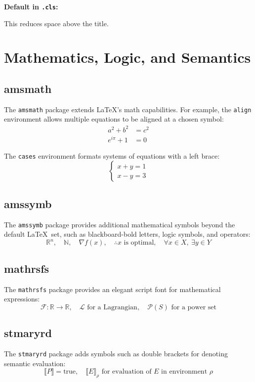 \documentclass{lecturenotes}
\begin{document}
\textbf{Default in \texttt{.cls}:}
\begin{codeblock}
\setlength{\droptitle}{-1in}
\end{codeblock}
This reduces space above the title.


\newpage
\section{Mathematics, Logic, and Semantics}

\subsection{amsmath}

The \texttt{amsmath} \cite{ctan:amsmath} package extends \LaTeX's math capabilities. For example, the \texttt{align} environment allows multiple equations to be aligned at a chosen symbol:
\begin{align}
a^2 + b^2 &= c^2 \\
e^{i\pi} + 1 &= 0
\end{align}

The \texttt{cases} environment formats systems of equations with a left brace:
\[
\begin{cases}
x + y = 1 \\
x - y = 3
\end{cases}
\]

\subsection{amssymb}
The \texttt{amssymb} package \cite{ctan:amsfonts} provides additional mathematical symbols beyond the default \LaTeX\ set, such as blackboard-bold letters, logic symbols, and operators:
\[
\mathbb{R}^n, \quad \mathbb{N}, \quad \nabla f(x), \quad \therefore x \text{ is optimal}, \quad \forall x \in X, \ \exists y \in Y
\]

\subsection{mathrsfs}
The \texttt{mathrsfs} package \cite{ctan:mathrsfs} provides an elegant script font for mathematical expressions:
\[
\mathscr{F} : \mathbb{R} \to \mathbb{R}, \quad \mathscr{L} \text{ for a Lagrangian}, \quad \mathscr{P}(S) \text{ for a power set}
\]


\subsection{stmaryrd}
The \texttt{stmaryrd} package \cite{ctan:stmaryrd} adds symbols such as double brackets for denoting semantic evaluation:
\[
\llbracket P \rrbracket = \text{true}, \quad \llbracket E \rrbracket_\rho \text{ for evaluation of } E \text{ in environment } \rho
\]
\end{document}
